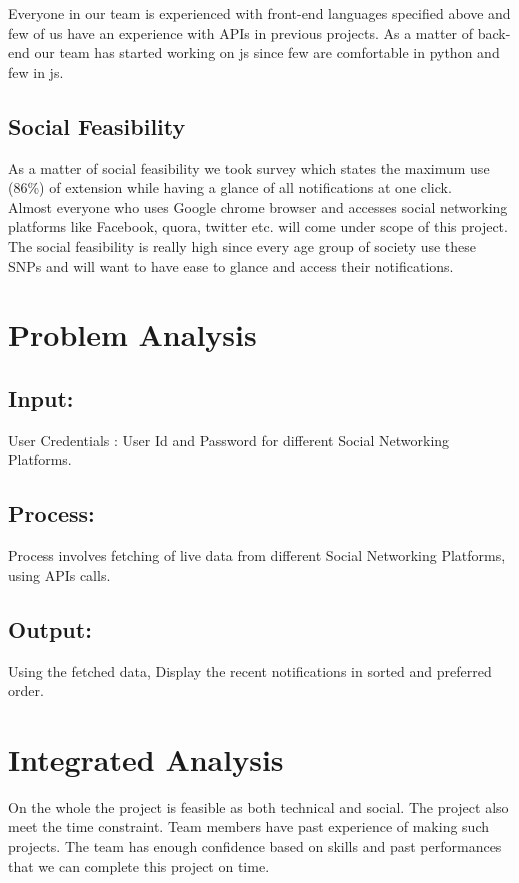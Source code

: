 \documentclass[12pt]{article}
\begin{document}
\hspace{10pt}	
	Everyone in our team is experienced with front-end languages specified above and few of us have an experience with APIs in previous projects. As a matter of back-end our team has started working on js since few are comfortable in python and few in js.
	
	\subsection{Social Feasibility}
	As a matter of social feasibility we took survey which states the maximum use (86\%) of extension while having a glance of all notifications at one click.\\Almost everyone who uses Google chrome  browser and accesses social networking platforms like Facebook, quora, twitter etc. will come under scope of this project.\\The social feasibility is really high since every age group of society use these SNPs and will want to have ease to glance and access their notifications.
	\section{Problem Analysis}
	\subsection{Input:} 
	User Credentials : User Id and Password for different Social Networking Platforms.
	\subsection{Process:} Process involves fetching of live data from different Social Networking Platforms, using APIs calls. 
	\subsection{Output:} 
	Using the fetched data, Display the recent notifications in sorted and preferred order.
	
    \section{Integrated Analysis}
    On the whole the project is feasible as both technical and social. The project
also meet the time constraint. Team members have past experience of
making such projects. The team has enough confidence based on skills and past
performances that we can complete this project on time.
	\newpage
	
	
\end{document}
